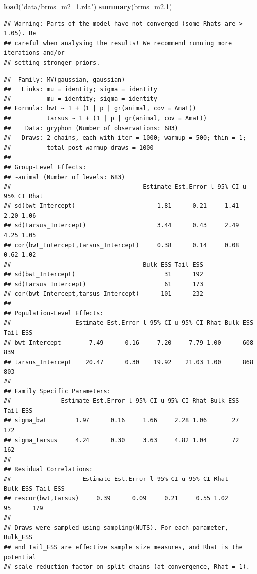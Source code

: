 \documentclass[
  12pt,
]{book}
\newenvironment{Shaded}{\begin{snugshade}}{\end{snugshade}}
\newcommand{\FloatTok}[1]{\textcolor[rgb]{0.00,0.00,0.81}{#1}}
\newcommand{\KeywordTok}[1]{\textcolor[rgb]{0.13,0.29,0.53}{\textbf{#1}}}
\newcommand{\NormalTok}[1]{#1}
\newcommand{\StringTok}[1]{\textcolor[rgb]{0.31,0.60,0.02}{#1}}
\begin{document}
\begin{Shaded}
\begin{Highlighting}[]
\KeywordTok{load}\NormalTok{(}\StringTok{"data/brms\_m2\_1.rda"}\NormalTok{)}
\KeywordTok{summary}\NormalTok{(brms\_m2}\FloatTok{.1}\NormalTok{)}
\end{Highlighting}
\end{Shaded}

\begin{verbatim}
## Warning: Parts of the model have not converged (some Rhats are > 1.05). Be
## careful when analysing the results! We recommend running more iterations and/or
## setting stronger priors.
\end{verbatim}

\begin{verbatim}
##  Family: MV(gaussian, gaussian) 
##   Links: mu = identity; sigma = identity
##          mu = identity; sigma = identity 
## Formula: bwt ~ 1 + (1 | p | gr(animal, cov = Amat)) 
##          tarsus ~ 1 + (1 | p | gr(animal, cov = Amat)) 
##    Data: gryphon (Number of observations: 683) 
##   Draws: 2 chains, each with iter = 1000; warmup = 500; thin = 1;
##          total post-warmup draws = 1000
## 
## Group-Level Effects: 
## ~animal (Number of levels: 683) 
##                                     Estimate Est.Error l-95% CI u-95% CI Rhat
## sd(bwt_Intercept)                       1.81      0.21     1.41     2.20 1.06
## sd(tarsus_Intercept)                    3.44      0.43     2.49     4.25 1.05
## cor(bwt_Intercept,tarsus_Intercept)     0.38      0.14     0.08     0.62 1.02
##                                     Bulk_ESS Tail_ESS
## sd(bwt_Intercept)                         31      192
## sd(tarsus_Intercept)                      61      173
## cor(bwt_Intercept,tarsus_Intercept)      101      232
## 
## Population-Level Effects: 
##                  Estimate Est.Error l-95% CI u-95% CI Rhat Bulk_ESS Tail_ESS
## bwt_Intercept        7.49      0.16     7.20     7.79 1.00      608      839
## tarsus_Intercept    20.47      0.30    19.92    21.03 1.00      868      803
## 
## Family Specific Parameters: 
##              Estimate Est.Error l-95% CI u-95% CI Rhat Bulk_ESS Tail_ESS
## sigma_bwt        1.97      0.16     1.66     2.28 1.06       27      172
## sigma_tarsus     4.24      0.30     3.63     4.82 1.04       72      162
## 
## Residual Correlations: 
##                    Estimate Est.Error l-95% CI u-95% CI Rhat Bulk_ESS Tail_ESS
## rescor(bwt,tarsus)     0.39      0.09     0.21     0.55 1.02       95      179
## 
## Draws were sampled using sampling(NUTS). For each parameter, Bulk_ESS
## and Tail_ESS are effective sample size measures, and Rhat is the potential
## scale reduction factor on split chains (at convergence, Rhat = 1).
\end{verbatim}
\end{document}

